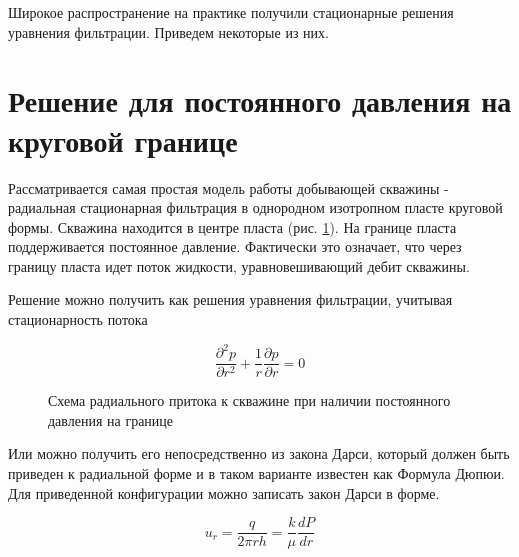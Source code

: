 Широкое распространение на практике получили стационарные решения уравнения фильтрации. Приведем некоторые из них.

\section{Решение для постоянного давления на круговой границе}

Рассматривается самая простая модель работы добывающей скважины - радиальная стационарная фильтрация в однородном изотропном пласте круговой формы. Скважина находится в центре пласта (рис. \ref{ris:radial_inflow_steady_state_1}). На границе пласта поддерживается постоянное давление. Фактически это означает, что через границу пласта идет поток жидкости, уравновешивающий дебит скважины. 

Решение можно получить как решения уравнения фильтрации, учитывая стационарность потока

\begin{equation} \label{eq:diff_eq_1} 
	\frac{\partial ^2 p }{\partial r^2} + \frac{1}{r} \frac{\partial p}{\partial r} = 0
\end{equation}

  

\begin{figure}[h!]
	\begin{center}
		
		\caption{Схема радиального притока к скважине при наличии постоянного давления на границе}
		\label{ris:radial_inflow_steady_state_1}
	\end{center}
\end{figure}

Или можно получить его непосредственно из закона Дарси, который должен быть приведен к радиальной форме и в таком варианте известен как Формула Дюпюи.
Для приведенной конфигурации можно записать закон Дарси в форме.

$$u_r=\frac{q}{2\pi rh}=\frac{k}{\mu}\frac{dP}{dr}$$

